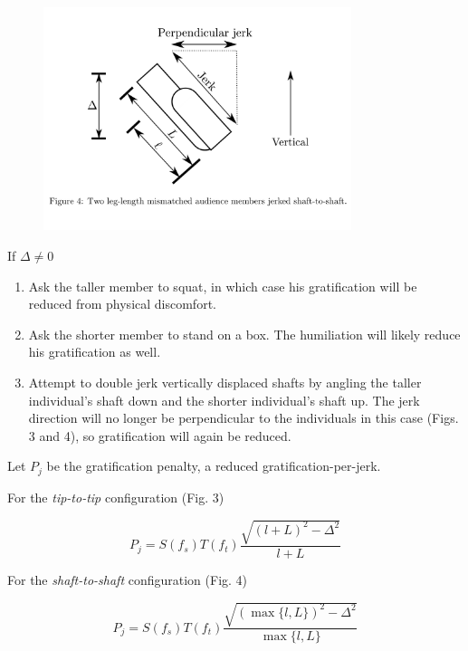 \documentclass{beamer}
\begin{document}
\begin{frame}
    \begin{figure}
        \includegraphics[width=9cm]{s2s}
    \end{figure}
\end{frame}

\begin{frame}
    If $\Delta \neq 0$ 

    \begin{enumerate}
        \item Ask the taller member to squat, in which case his gratification will be reduced from physical discomfort.
        \item Ask the shorter member to stand on a box. The humiliation will likely reduce his gratification as well.
        \item Attempt to double jerk vertically displaced shafts by angling the taller individual's shaft down and the shorter individual’s shaft up. The jerk direction will no longer be perpendicular to the individuals in this case (Figs. 3 and 4), so gratification will again be reduced.
    \end{enumerate}

\end{frame}

\begin{frame}

    Let $P_j$ be the gratification penalty, a reduced gratification-per-jerk.

    For the \textit{tip-to-tip} configuration (Fig. 3)

    \[
        P_j = S(f_s)T(f_t) \frac{\sqrt{(l + L)^2 - \Delta ^ 2}}{l + L}
    \]

    For the \textit{shaft-to-shaft} configuration (Fig. 4)

    \[
        P_j = S(f_s)T(f_t) \frac{\sqrt{(\max \{l, L\})^2 - \Delta ^ 2}}{\max \{l, L\}}
    \]

\end{frame}
\end{document}
